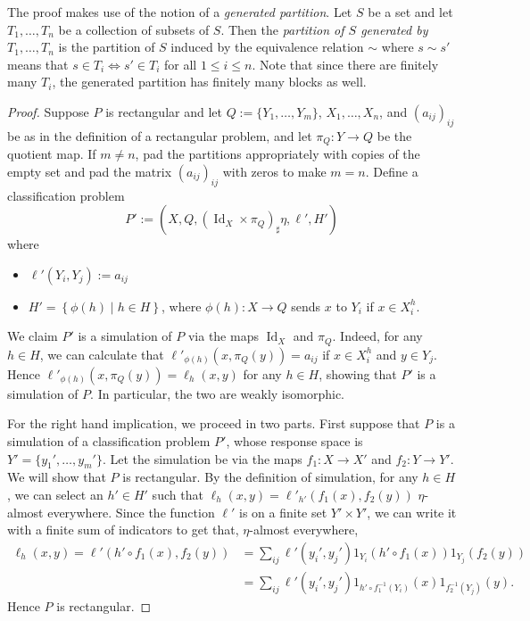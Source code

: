 \documentclass[twoside,11pt]{article}
\DeclareMathOperator{\id}{Id}
\newcommand{\set}[2]{\left\{ #1\middle| #2\right\}}
\begin{document}
The proof makes use of the notion of a \emph{generated partition}. Let $S$ be a set and let $T_1,\dots,T_n$ be a collection of subsets of $S$. Then the \emph{partition of $S$ generated by $T_1,\dots,T_n$} is the partition of $S$ induced by the equivalence relation ${\sim}$ where $s\sim s'$ means that $s\in T_i \iff s'\in T_i$ for all $1\leq i \leq n$.
Note that since there are finitely many $T_i$, the generated partition has finitely many blocks as well.
\begin{proof}
    Suppose $P$ is rectangular and let $Q:=\{Y_1,\dots,Y_m\}$, $X_1,\dots,X_n$, and $(a_{ij})_{ij}$ be as in the definition of a rectangular problem, and let $\pi_Q:Y\to Q$ be the quotient map. If $m\neq n$, pad the partitions appropriately with copies of the empty set and pad the matrix $(a_{ij})_{ij}$ with zeros to make $m=n$. Define a classification problem
    \[P':=(X,Q,(\id_X\times \pi_Q)_\sharp \eta, \ell', H')\]
    where
    \begin{itemize}
        \item $\ell'(Y_i,Y_j):=a_{ij}$
        \item $H'=\set{\phi(h)}{h\in H}$,  where $\phi(h):X \to Q$ sends $x$ to $Y_i$ if $x\in X^{h}_i$.
    \end{itemize}
    We claim $P'$ is a simulation of $P$ via the maps $\id_X$ and $\pi_Q$. Indeed, for any $h\in H$, we can calculate that $\ell'_{\phi(h)}(x,\pi_Q(y)) = a_{ij}$ if $x\in X^h_i$ and $y\in Y_j$. Hence $\ell'_{\phi(h)}(x,\pi_Q(y))=\ell_h(x,y)$ for any $h\in H$, showing that $P'$ is a simulation of $P$. In particular, the two are weakly isomorphic.

    For the right hand implication, we proceed in two parts. First suppose that $P$ is a simulation of a classification problem $P'$, whose response space is $Y' = \{y_1',\dots,y_m'\}$. Let the simulation be via the maps $f_1:X\to X'$ and $f_2:Y\to Y'$. We will show that $P$ is rectangular. By the definition of simulation, for any $h\in H$, we can select an $h'\in H'$ such that $\ell_h(x,y) = \ell'_{h'}(f_1(x),f_2(y))$ $\eta$-almost everywhere. Since the function $\ell'$ is on a finite set $Y'\times Y'$, we can write it with a finite sum of indicators to get that, $\eta$-almost everywhere,
    \begin{align*}
        \ell_h(x,y)
        = \ell'(h'\circ f_1(x),f_2(y))
        & =
        \sum_{ij}\ell'(y_i',y_j')1_{Y_i}(h'\circ f_1(x))1_{Y_j}(f_2(y))
        \\ & =
        \sum_{ij}\ell'(y_i',y_j')1_{h'\circ f_1^{-1}(Y_i)}(x)1_{f_2^{-1}(Y_j)}(y).
    \end{align*}
    Hence $P$ is rectangular.


\end{proof}
\end{document}
